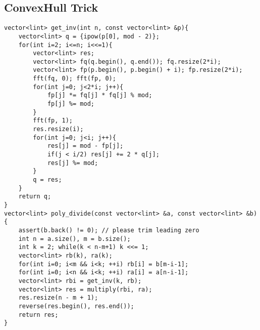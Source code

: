 \documentclass[landscape, 8pt, a4paper, oneside, twocolumn]{extarticle}
\begin{document}
\subsection{ConvexHull Trick}
\begin{verbatim}
vector<lint> get_inv(int n, const vector<lint> &p){
	vector<lint> q = {ipow(p[0], mod - 2)};
	for(int i=2; i<=n; i<<=1){
		vector<lint> res;
		vector<lint> fq(q.begin(), q.end()); fq.resize(2*i);
		vector<lint> fp(p.begin(), p.begin() + i); fp.resize(2*i);
		fft(fq, 0); fft(fp, 0);
		for(int j=0; j<2*i; j++){
			fp[j] *= fq[j] * fq[j] % mod;
			fp[j] %= mod;
		}
		fft(fp, 1);
		res.resize(i);
		for(int j=0; j<i; j++){
			res[j] = mod - fp[j];
			if(j < i/2) res[j] += 2 * q[j];
			res[j] %= mod;
		}
		q = res;
	}
	return q;
}
vector<lint> poly_divide(const vector<lint> &a, const vector<lint> &b){
	assert(b.back() != 0); // please trim leading zero
	int n = a.size(), m = b.size();
	int k = 2; while(k < n-m+1) k <<= 1;
	vector<lint> rb(k), ra(k);
	for(int i=0; i<m && i<k; ++i) rb[i] = b[m-i-1];
	for(int i=0; i<n && i<k; ++i) ra[i] = a[n-i-1];
	vector<lint> rbi = get_inv(k, rb);
	vector<lint> res = multiply(rbi, ra);
	res.resize(n - m + 1);
	reverse(res.begin(), res.end());
	return res;
}
\end{verbatim}
\end{document}

